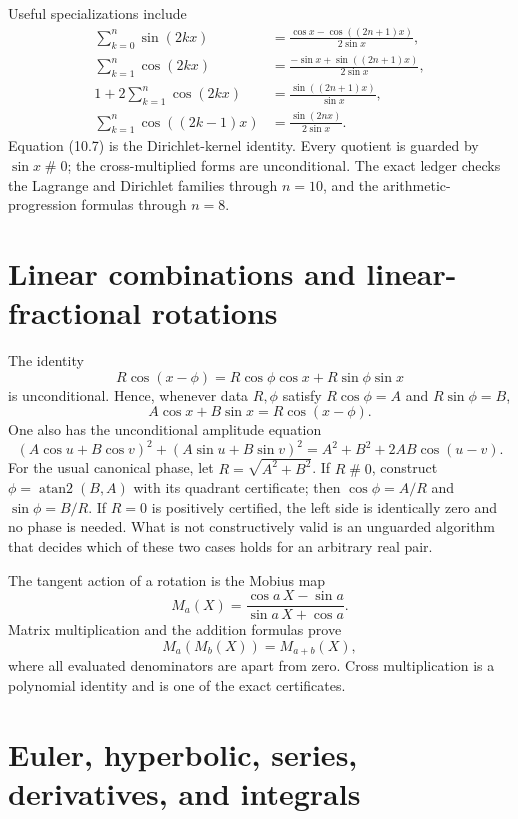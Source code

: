 \documentclass[11pt]{article}
\theoremstyle{definition}
\newcommand{\apart}{\mathrel{\#}}
\newcommand{\atanTwo}{\operatorname{atan2}}
\begin{document}
Useful specializations include
\begin{align}
 \sum_{k=0}^n\sin(2kx)
 &=\frac{\cos x-\cos((2n+1)x)}{2\sin x},\tag{10.5}\\
 \sum_{k=1}^n\cos(2kx)
 &=\frac{-\sin x+\sin((2n+1)x)}{2\sin x},\tag{10.6}\\
 1+2\sum_{k=1}^n\cos(2kx)
 &=\frac{\sin((2n+1)x)}{\sin x},\tag{10.7}\\
 \sum_{k=1}^n\cos((2k-1)x)
 &=\frac{\sin(2nx)}{2\sin x}.
 \tag{10.8}
\end{align}
Equation (10.7) is the Dirichlet-kernel identity.  Every quotient is guarded by
\(\sin x\apart0\); the cross-multiplied forms are unconditional.  The exact
ledger checks the Lagrange and Dirichlet families through \(n=10\), and the
arithmetic-progression formulas through \(n=8\).

\section{Linear combinations and linear-fractional rotations}
\label{sec:linear}

The identity
\[
 R\cos(x-\phi)=R\cos\phi\cos x+R\sin\phi\sin x
 \tag{11.1}
\]
is unconditional.  Hence, whenever data \(R,\phi\) satisfy
\(R\cos\phi=A\) and \(R\sin\phi=B\),
\[
 A\cos x+B\sin x=R\cos(x-\phi).
 \tag{11.2}
\]
One also has the unconditional amplitude equation
\[
 (A\cos u+B\cos v)^2+(A\sin u+B\sin v)^2
 =A^2+B^2+2AB\cos(u-v).
 \tag{11.3}
\]
For the usual canonical phase, let \(R=\sqrt{A^2+B^2}\).  If \(R\apart0\),
construct \(\phi=\atanTwo(B,A)\) with its quadrant certificate; then
\(\cos\phi=A/R\) and \(\sin\phi=B/R\).  If \(R=0\) is positively certified,
the left side is identically zero and no phase is needed.  What is not
constructively valid is an unguarded algorithm that decides which of these two
cases holds for an arbitrary real pair.

The tangent action of a rotation is the Mobius map
\[
 M_a(X)=\frac{\cos a\,X-\sin a}{\sin a\,X+\cos a}.
 \tag{11.4}
\]
Matrix multiplication and the addition formulas prove
\[
 M_a(M_b(X))=M_{a+b}(X),
 \tag{11.5}
\]
where all evaluated denominators are apart from zero.  Cross multiplication is
a polynomial identity and is one of the exact certificates.

\section{Euler, hyperbolic, series, derivatives, and integrals}
\label{sec:analytic-families}
\end{document}
